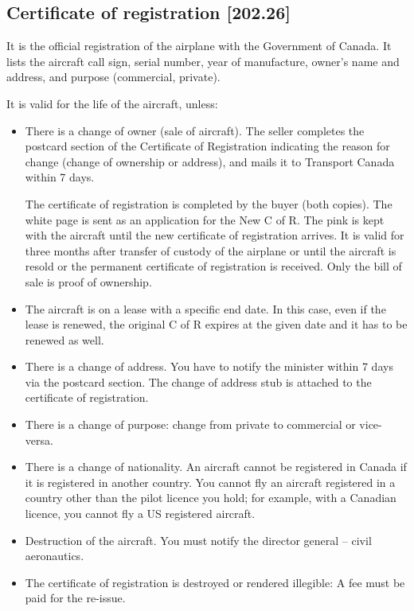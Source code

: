 \documentclass[12pt,letterpaper]{article}
\begin{document}
\subsection{Certificate of registration [202.26]}

    It is the official registration of the airplane with the Government of Canada. It lists the aircraft call sign, serial number, year of manufacture, owner’s name and address, and purpose (commercial, private).

    It is valid for the life of the aircraft, unless:
    \begin{itemize}
        \item There is a change of owner (sale of aircraft). The seller completes the postcard section of the Certificate of Registration indicating the reason for change (change of ownership or address), and mails it to Transport Canada within 7 days.
        
        The certificate of registration is completed by the buyer (both copies). The white page is sent as an application for the New C of R. The pink is kept with the aircraft until the new certificate of registration arrives. It is valid for three months after transfer of custody of the airplane or until the aircraft is resold or the permanent certificate of registration is received. Only the bill of sale is proof of ownership.
        
        \item The aircraft is on a lease with a specific end date. In this case, even if the lease is renewed, the original C of R expires at the given date and it has to be renewed as well.
        
        \item There is a change of address. You have to notify the minister within 7 days via the postcard section. The change of address stub is attached to the certificate of registration.

        \item There is a change of purpose: change from private to commercial or vice-versa.
        
        \item There is a change of nationality. An aircraft cannot be registered in Canada if it is registered in another country. You cannot fly an aircraft registered in a country other than the pilot licence you hold; for example, with a Canadian licence, you cannot fly a US registered aircraft. 
        
        \item Destruction of the aircraft. You must notify the director general – civil aeronautics.

        \item The certificate of registration is destroyed or rendered illegible: A fee must be paid for the re-issue.
    \end{itemize}
\end{document}
